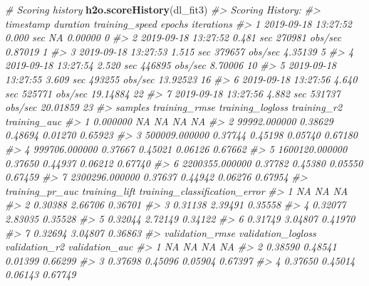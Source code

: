 \documentclass[]{book}
\newenvironment{Shaded}{\begin{snugshade}}{\end{snugshade}}
\newcommand{\CommentTok}[1]{\textcolor[rgb]{0.56,0.35,0.01}{\textit{#1}}}
\newcommand{\KeywordTok}[1]{\textcolor[rgb]{0.13,0.29,0.53}{\textbf{#1}}}
\newcommand{\NormalTok}[1]{#1}
\begin{document}
\begin{Shaded}
\begin{Highlighting}[]
\CommentTok{# Scoring history}
\KeywordTok{h2o.scoreHistory}\NormalTok{(dl_fit3)}
\CommentTok{#> Scoring History: }
\CommentTok{#>             timestamp   duration training_speed   epochs iterations}
\CommentTok{#> 1 2019-09-18 13:27:52  0.000 sec             NA  0.00000          0}
\CommentTok{#> 2 2019-09-18 13:27:52  0.481 sec 270981 obs/sec  0.87019          1}
\CommentTok{#> 3 2019-09-18 13:27:53  1.515 sec 379657 obs/sec  4.35139          5}
\CommentTok{#> 4 2019-09-18 13:27:54  2.520 sec 446895 obs/sec  8.70006         10}
\CommentTok{#> 5 2019-09-18 13:27:55  3.609 sec 493255 obs/sec 13.92523         16}
\CommentTok{#> 6 2019-09-18 13:27:56  4.640 sec 525771 obs/sec 19.14884         22}
\CommentTok{#> 7 2019-09-18 13:27:56  4.882 sec 531737 obs/sec 20.01859         23}
\CommentTok{#>          samples training_rmse training_logloss training_r2 training_auc}
\CommentTok{#> 1       0.000000            NA               NA          NA           NA}
\CommentTok{#> 2   99992.000000       0.38629          0.48694     0.01270      0.65923}
\CommentTok{#> 3  500009.000000       0.37744          0.45198     0.05740      0.67180}
\CommentTok{#> 4  999706.000000       0.37667          0.45021     0.06126      0.67662}
\CommentTok{#> 5 1600120.000000       0.37650          0.44937     0.06212      0.67740}
\CommentTok{#> 6 2200355.000000       0.37782          0.45380     0.05550      0.67459}
\CommentTok{#> 7 2300296.000000       0.37637          0.44942     0.06276      0.67954}
\CommentTok{#>   training_pr_auc training_lift training_classification_error}
\CommentTok{#> 1              NA            NA                            NA}
\CommentTok{#> 2         0.30388       2.66706                       0.36701}
\CommentTok{#> 3         0.31138       2.39491                       0.35558}
\CommentTok{#> 4         0.32077       2.83035                       0.35528}
\CommentTok{#> 5         0.32044       2.72149                       0.34122}
\CommentTok{#> 6         0.31749       3.04807                       0.41970}
\CommentTok{#> 7         0.32694       3.04807                       0.36863}
\CommentTok{#>   validation_rmse validation_logloss validation_r2 validation_auc}
\CommentTok{#> 1              NA                 NA            NA             NA}
\CommentTok{#> 2         0.38590            0.48541       0.01399        0.66299}
\CommentTok{#> 3         0.37698            0.45096       0.05904        0.67397}
\CommentTok{#> 4         0.37650            0.45014       0.06143        0.67749}

\end{Highlighting}
\end{Shaded}
\end{document}
